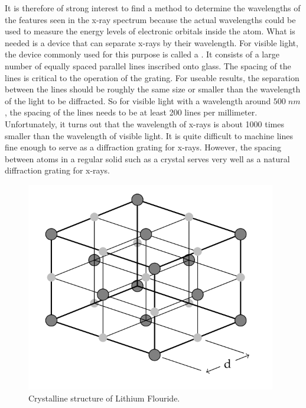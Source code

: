 \documentclass[12pt, a4paper, oneside, openright, titlepage]{book}
\begin{document}
\noindent It is therefore of strong interest to find a method to determine the wavelengths of the features seen in the x-ray spectrum because the actual wavelengths could be used to measure the energy levels of electronic orbitals inside the atom. What is needed is a device that can separate x-rays by their wavelength. For visible light, the device commonly used for this purpose is called a . It consists of a large number of equally spaced parallel lines inscribed onto glass. The spacing of the lines is critical to the operation of the grating. For useable results, the separation between the lines should be roughly the same size or smaller than the wavelength of the light to be diffracted. So for visible light with a wavelength around $500 \;nm$, the spacing of the lines needs to be at least 200 lines per millimeter. Unfortunately, it turns out that the wavelength of x-rays is about 1000 times smaller than the wavelength of visible light. It is quite difficult to machine lines fine enough to serve as a diffraction grating for x-rays. However, the spacing between atoms in a regular solid such as a crystal serves very well as a natural diffraction grating for x-rays.


\begin{figure}[H]
\centering
\includegraphics[scale = 0.8]{Images/XR6.PNG}
\caption{Crystalline structure of Lithium Flouride.}
\label{fig:XR6}
\end{figure}
\end{document}
